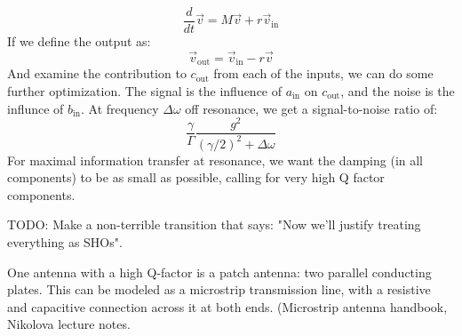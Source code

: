 \documentclass[final]{article}
\begin{document}
\[\frac{d}{dt} \vec v=M\vec v+r\vec v_{\text{in}}\]
If we define the output as:
\[\vec v_{\text{out}}=\vec v_{\text{in}}-r \vec v\]
And examine the contribution to \(c_{\text{out}}\) from each of the inputs, we can do some further optimization. The signal is the influence of \(a_{\text{in}}\) on \(c_{\text{out}}\), and the noise is the influnce of \(b_{\text{in}}\). At frequency \(\Delta \omega\) off resonance, we get a signal-to-noise ratio of:
\[\frac{\gamma}{\Gamma}\frac{g^2}{(\gamma/2)^2+\Delta \omega}\]
For maximal information transfer at resonance, we want the damping (in all components) to be as small as possible, calling for very high Q factor components.

TODO: Make a non-terrible transition that says: "Now we'll justify treating everything as SHOs".

One antenna with a high Q-factor is a patch antenna: two parallel conducting plates. This can be modeled as a microstrip transmission line, with a resistive and capacitive connection across it at both ends. (Microstrip antenna handbook, Nikolova lecture notes.
\end{document}
